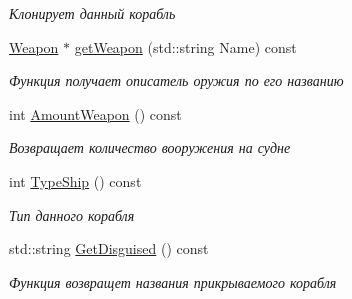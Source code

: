 \begin{DoxyCompactItemize}
\begin{DoxyCompactList}\small\item\em Клонирует данный корабль \end{DoxyCompactList}\item 
\mbox{\hyperlink{class_aircraft_carrier_group_1_1_weapon}{Weapon}} $\ast$ \mbox{\hyperlink{class_aircraft_carrier_group_1_1_aircraft_carrier_aa7839178084e4f749592e02d2d8e93a4}{get\+Weapon}} (std\+::string Name) const
\begin{DoxyCompactList}\small\item\em Функция получает описатель оружия по его названию \end{DoxyCompactList}\item 
\mbox{\label{class_aircraft_carrier_group_1_1_aircraft_carrier_abddfdb193451143aa371c5fb86705afb}} 
int \mbox{\hyperlink{class_aircraft_carrier_group_1_1_aircraft_carrier_abddfdb193451143aa371c5fb86705afb}{Amount\+Weapon}} () const
\begin{DoxyCompactList}\small\item\em Возвращает количество вооружения на судне \end{DoxyCompactList}\item 
\mbox{\label{class_aircraft_carrier_group_1_1_aircraft_carrier_a23197fb96cb38227da69687d8fe75124}} 
int \mbox{\hyperlink{class_aircraft_carrier_group_1_1_aircraft_carrier_a23197fb96cb38227da69687d8fe75124}{Type\+Ship}} () const
\begin{DoxyCompactList}\small\item\em Тип данного корабля \end{DoxyCompactList}\item 
std\+::string \mbox{\hyperlink{class_aircraft_carrier_group_1_1_aircraft_carrier_ae6d7a76049249ef218e6859334ed2eaa}{Get\+Disguised}} () const
\begin{DoxyCompactList}\small\item\em Функция возвращет названия прикрываемого корабля \end{DoxyCompactList}\end{DoxyCompactItemize}
